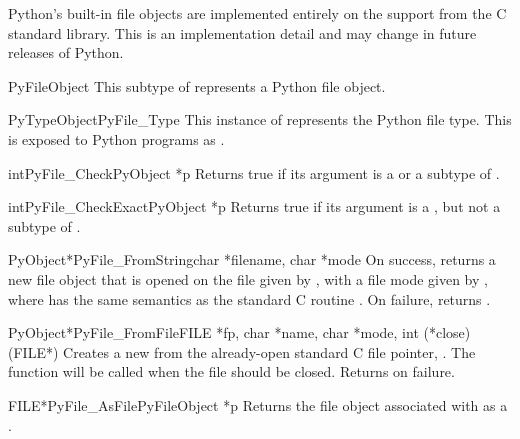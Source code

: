 Python's built-in file objects are implemented entirely on the
 support from the C standard library.  This is an
implementation detail and may change in future releases of Python.

\begin{ctypedesc}{PyFileObject}
  This subtype of  represents a Python file object.
\end{ctypedesc}

\begin{cvardesc}{PyTypeObject}{PyFile_Type}
  This instance of  represents the Python file
  type.  This is exposed to Python programs as .
\end{cvardesc}

\begin{cfuncdesc}{int}{PyFile_Check}{PyObject *p}
  Returns true if its argument is a  or a subtype
  of .
\end{cfuncdesc}

\begin{cfuncdesc}{int}{PyFile_CheckExact}{PyObject *p}
  Returns true if its argument is a , but not a
  subtype of .
\end{cfuncdesc}

\begin{cfuncdesc}{PyObject*}{PyFile_FromString}{char *filename, char *mode}
  On success, returns a new file object that is opened on the file
  given by , with a file mode given by , where
   has the same semantics as the standard C routine
  .  On failure, returns \NULL.
\end{cfuncdesc}

\begin{cfuncdesc}{PyObject*}{PyFile_FromFile}{FILE *fp,
                                              char *name, char *mode,
                                              int (*close)(FILE*)}
  Creates a new  from the already-open standard C
  file pointer, .  The function  will be called
  when the file should be closed.  Returns \NULL{} on failure.
\end{cfuncdesc}

\begin{cfuncdesc}{FILE*}{PyFile_AsFile}{PyFileObject *p}
  Returns the file object associated with  as a .
\end{cfuncdesc}

